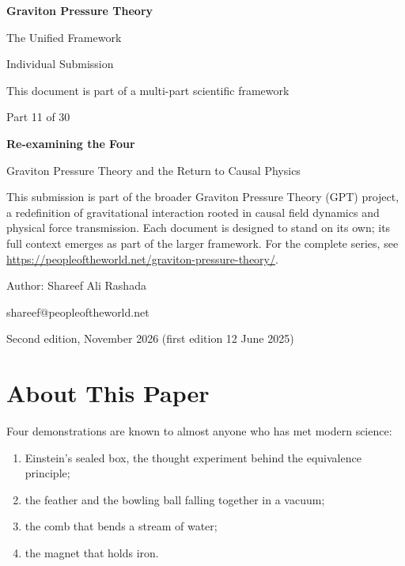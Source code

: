 \documentclass[11pt,a4paper]{article}
\begin{document}
\renewcommand{\thetable}{11.\arabic{table}}
\begin{titlepage}
\centering
\vspace*{1.5cm}
{\Huge\bfseries Graviton Pressure Theory\par}
\vspace{0.4cm}
{\Large The Unified Framework\par}
{\large Individual Submission\par}
\vspace{0.3cm}
{\normalsize This document is part of a multi-part scientific framework\par}
\vspace{1.6cm}
{\large Part 11 of 30\par}
\vspace{0.6cm}
{\huge\bfseries Re-examining the Four\par}
\vspace{0.5cm}
{\Large Graviton Pressure Theory and the Return to Causal Physics\par}
\vspace{1.4cm}
\begin{minipage}{0.82\textwidth}\centering\small
This submission is part of the broader Graviton Pressure Theory (GPT) project, a redefinition of gravitational interaction rooted in causal field dynamics and physical force transmission. Each document is designed to stand on its own; its full context emerges as part of the larger framework. For the complete series, see \url{https://peopleoftheworld.net/graviton-pressure-theory/}.
\end{minipage}
\vfill
{\large Author: Shareef Ali Rashada\par}
{\normalsize shareef@peopleoftheworld.net\par}
\vspace{0.3cm}
{\normalsize Second edition, November 2026 \quad (first edition 12 June 2025)\par}
\end{titlepage}

\tableofcontents
\newpage

\section*{About This Paper}

Four demonstrations are known to almost anyone who has met modern science:
\begin{enumerate}
    \item Einstein's sealed box, the thought experiment behind the equivalence principle;
    \item the feather and the bowling ball falling together in a vacuum;
    \item the comb that bends a stream of water;
    \item the magnet that holds iron.
\end{enumerate}
\end{document}
